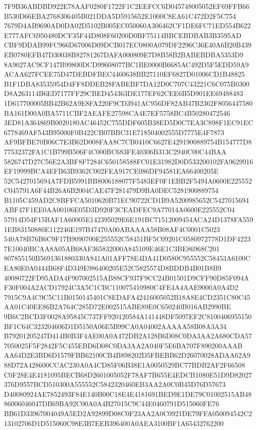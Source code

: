 \documentclass[UTF8,fontset=fandol,zihao=-4,a4paper]{ctexart}
\begin{document}
{{7F9B36ABDBD922E78AAF0280F1722F1C2EEFCC6D045748005052EF69FFB66B530D66EBA2768306405B021DDA5D5915652E1000C8EA61C472D2F5C754
7679D4AB9690AD0DA02D5102B005EC050060A306462CF1DE6FC71ED554B622E777AFC6950480DCF35F44D808F60200D0BF75114BBCEBDBAB3B3595AD
CBF9DDAB99FC966D67006D09DCB017EC0800A079DF2296C36E40A6B20B439EB0780EFB47D30038B82781267DAFA000809E7D8B58B2BABEBDBA5353D9
8A9027AC9CF147B99800DCD99608077BC1BE0000B6685AC492D5F5EDD59A9ACAA627FCEE75D47DEBDFBEC4460638BB27110EF6827D01006CD1B48825
B1F1DBA83535954D4FF8DDEB28FABEBF7DA12D0C707C43221C6C075B0300D8A263114B6ED7177FF29CBED454363DE177EF62CEE6B5D901EE69488483
1D617700005BB42B62A9E8FA220F9CD3941AC956DF82AB47B2362F8056447580BA161D00A0BA5711CBF2AEAFE27598CA4E7EF5758BC4B50280472546
3ED81A364869B0020180AC46452C755DDF605B38ED5D0C7EA3C898F1EC91EC6778469AF543B95000F0B422CB07BBC31E718504002555D7775E4F7873
AF9BFBE70B06C7E3B62D008FAA8C7CB0410C6627E4291900889754B154777D877532372FA1C1B799B506F4C000BC683FE40306B313C2940C00C44BAA
5826747D27C56E2A3BF8F7284C650158588FC01E31982D0D533200102FA9629916EF19999BCA4EFB63B9362C002FEA917CE086DF94581EA66400205E
52C5427015694A7FDB5991BB8006188077F5483EF0F1EBB2F5494A0600E225552C045791A6F44B26A6B2004CAE47F281479D9BA0DEC5281900889754
B1105C459AD2C8BFFCA5010620B71EC90722CD1B9A5200985652C5427015694ABF47F1EE0AA00106E05D3D920F3CEADFEC9A77014A0600E225552C04
57914D54F15BAF1A60005E142395029E6E191BC71512009454ACA24D1378FA5591EB83150880E112246E197B47470A00ABAAAA58B08AF4C0001C5023
540A78B76B6C9F17B9090700E255552C58451BF5C09201C0580972778D1DF42237E10040BCAA8A05AB68AF365832000A845109E46E1C3BE86968C201
807855150B5691361880330A841A01AFF78E4DA41D0580C955552C58453A6100CEA80E0A0444B68F4D349E986400205E52C5825574D8BDDB4B01B8B9
40080722FD95ADA4F907002515AB88CF937F9CC24B01501D9CFF90D85F094AF30F004A2ACD17924C3A5C1CBC110075410980C4FE4A4AAE9000A0A4D2
7915C9A4C9C5C11B0150145401C8EDAFA42416005052B18A8E4CD2351C80C45AA01C40EE86B2A764C285D72E002515ABE89E0C650240B016AB2990BE
9B6C2BCD3F0028A95845C737FF920120584A141448DF5097EF2C8100406955150BF1C64C323204606D1D5150A06E5B99CA0A04002AAAAA58B08A3A34
B79201205247D414B0B3F4AE00A0A472DB2A128B6D08C0DA3AA2A680CDA577050025F5F2842F5C455EBD6D08C0DA3AA2A040F5E6BA707F890200AAAB
AA64D2E3BD6D1579FBB62100CB4B898202D5FBEBB62D26070028ADAA62A988D72A428600CCAC230A0A4CD85F06B38E1A0050529BC77BDB2AF2F66508
C0F28E4E4181095BECB68D2601005052F78AF7B655E4EDCB1080E51D9D82027376D9557BCD510300A555552C5842320460EB3AA2A0C0B45D76D57673
D40080924AE7852493F84E140B00C18E4E4181691BED9E1DE79C01002515AB4886006046047DB69BA92C00A0A4B27015C9C44E0460791D515060FE76
BB61D33967004049A5ED2A92899D08C0F23AA2A0C0921DE79FFA050094542C213102706D1D515060C98E3B7EEB396400A0AEA3100BF1A65432762200
}}
\end{document}
